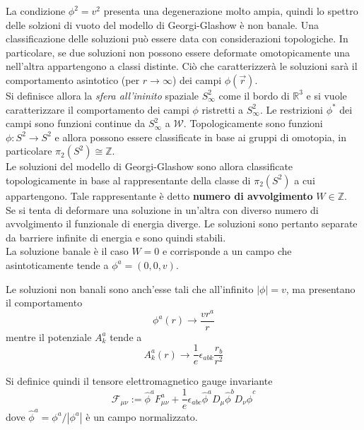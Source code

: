 La condizione $\phi^2 = v^2$ presenta una degenerazione molto ampia, quindi
lo spettro delle solzioni di vuoto del modello di Georgi-Glashow è non banale.
Una classificazione delle soluzioni può essere data con considerazioni topologiche.
In particolare, se due soluzioni non possono essere deformate omotopicamente una
nell'altra appartengono a classi distinte. Ciò che caratterizzerà le soluzioni
sarà il comportamento asintotico (per $r \to \infty$) dei campi $\phi(\vec r)$.\\

Si definisce allora la \emph{sfera all'ininito} spaziale $S^2_\infty$ come il bordo di
$\mathbb{R}^3$ e si vuole caratterizzare il comportamento dei campi $\phi$ ristretti a
$S^2_\infty$. Le restrizioni $\phi^*$ dei campi sono funzioni continue da $S^2_\infty$
a $\mathcal{W}$.
Topologicamente sono funzioni $\phi : S^2 \to S^2$ e allora possono essere
classificate in base ai gruppi di omotopia, in particolare $\pi_2(S^2) \cong \mathbb{Z}$.\\

Le soluzioni del modello di Georgi-Glashow sono allora classificate topologicamente
in base al rappresentante della classe di $\pi_2(S^2)$ a cui appartengono.
Tale rappresentante è detto \textbf{numero di avvolgimento} $W \in \mathbb{Z}$.\\

Se si tenta di deformare una soluzione in un'altra con diverso numero di avvolgimento
il funzionale di energia diverge. Le soluzioni sono pertanto separate da barriere
infinite di energia e sono quindi stabili.\\

La soluzione banale è il caso $W = 0$ e corrisponde a un campo che asintoticamente
tende a $\phi^a = (0,0,v)$.

Le soluzioni non banali sono anch'esse tali che all'infinito $|\phi| = v$, ma presentano
il comportamento
\begin{equation}\label{eq:nonabelianw1phi}
   \phi^a(r) \to \frac{vr^a}{r}
\end{equation}
mentre il potenziale $A_k^a$ tende a
\begin{equation}\label{eq:nonabelianw1A}
   A_k^a (r) \to \frac{1}{e} \epsilon_{abk} \frac{r_b}{r^2}
\end{equation}

Si definice quindi il tensore elettromagnetico gauge invariante
\begin{equation}
   \mathcal{F}_{\mu\nu} := \hat{\phi}^a F^a_{\mu\nu}
          + \frac{1}{e} \epsilon_{abc} \hat{\phi}^a D_\mu\hat{\phi}^b D_\nu \hat{\phi}^c
\end{equation}
dove $\hat{\phi}^a = \phi^a/|\phi^a|$ è un campo normalizzato.
